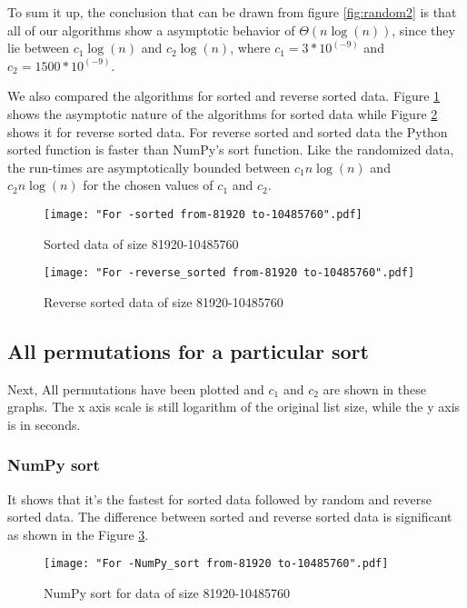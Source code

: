 \documentclass[sigconf, nonacm, natbib, screen, balance=False]{acmart}
\begin{document}
To sum it up, the conclusion that can be drawn from figure \ref{fig:random2} is that all of our algorithms show a asymptotic behavior of $\Theta \left(n \log\left(n\right)\right)$, since they lie between $c_1 \log\left(n\right)$ and $c_2 \log\left(n\right)$, where $c_1=3 * 10^(-9)$ and $c_2= 1500  * 10^(-9)$. \newline

We also compared the algorithms for sorted and reverse sorted data. Figure \ref{fig:sorted1} shows the asymptotic nature of the algorithms for sorted data while Figure \ref{fig:rsorted1} shows it for reverse sorted data. \newline
For reverse sorted and sorted data the Python sorted function is faster than NumPy's sort function. Like the randomized data, the run-times are asymptotically bounded between $c_1 n \log\left(n\right)$  and $c_2 n \log\left(n\right)$ for the chosen values of $c_1$ and $c_2$.\newline


\begin{figure}[ht]
\texttt{[image: "For -sorted from-81920 to-10485760".pdf]}
    \caption{Sorted data of size 81920-10485760 }
    \label{fig:sorted1}
\end{figure}

\begin{figure}[ht]
\texttt{[image: "For -reverse\_sorted from-81920 to-10485760".pdf]}
    \caption{Reverse sorted data of size 81920-10485760 }
    \label{fig:rsorted1}
\end{figure}

\subsection{All permutations for a particular sort }\label{allpermut}

Next, All permutations have been plotted and $c_1$ and $c_2$ are shown in these graphs. The x axis scale is still logarithm of the original list size, while the y axis is in seconds.

\subsubsection{NumPy sort}
It shows that it's the fastest for sorted data followed by random and reverse sorted data. The difference between sorted and reverse sorted data is significant as shown in the Figure \ref{fig:NumPysort}.

\begin{figure}[ht]
\texttt{[image: "For -NumPy\_sort from-81920 to-10485760".pdf]}
    \caption{NumPy sort for data of size 81920-10485760 }
    \label{fig:NumPysort}
\end{figure}
\end{document}
